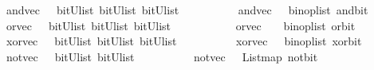 \begin{isabellebody}
{}\isanewline
{}\isamarkupfalse%
\ and{\isacharunderscore}vec\ \ {\isacharcolon}{\isacharcolon}\ {\isachardoublequoteopen}{\isacharparenleft}bitU{\isacharparenright}list\ {\isasymRightarrow}{\isacharparenleft}bitU{\isacharparenright}list\ {\isasymRightarrow}{\isacharparenleft}bitU{\isacharparenright}list\ {\isachardoublequoteclose}\ \ \ \isanewline
\ \ \ \ \ {\isachardoublequoteopen}\ and{\isacharunderscore}vec\ {\isacharequal}\ {\isacharparenleft}\ binop{\isacharunderscore}list\ and{\isacharunderscore}bit\ {\isacharparenright}{\isachardoublequoteclose}\isanewline
\isanewline
{}\isamarkupfalse%
\ or{\isacharunderscore}vec\ \ {\isacharcolon}{\isacharcolon}\ {\isachardoublequoteopen}{\isacharparenleft}bitU{\isacharparenright}list\ {\isasymRightarrow}{\isacharparenleft}bitU{\isacharparenright}list\ {\isasymRightarrow}{\isacharparenleft}bitU{\isacharparenright}list\ {\isachardoublequoteclose}\ \ \ \ \isanewline
\ \ \ \ \ {\isachardoublequoteopen}\ or{\isacharunderscore}vec\ \ {\isacharequal}\ {\isacharparenleft}\ binop{\isacharunderscore}list\ or{\isacharunderscore}bit\ {\isacharparenright}{\isachardoublequoteclose}\isanewline
\isanewline
{}\isamarkupfalse%
\ xor{\isacharunderscore}vec\ \ {\isacharcolon}{\isacharcolon}\ {\isachardoublequoteopen}{\isacharparenleft}bitU{\isacharparenright}list\ {\isasymRightarrow}{\isacharparenleft}bitU{\isacharparenright}list\ {\isasymRightarrow}{\isacharparenleft}bitU{\isacharparenright}list\ {\isachardoublequoteclose}\ \ \ \isanewline
\ \ \ \ \ {\isachardoublequoteopen}\ xor{\isacharunderscore}vec\ {\isacharequal}\ {\isacharparenleft}\ binop{\isacharunderscore}list\ xor{\isacharunderscore}bit\ {\isacharparenright}{\isachardoublequoteclose}\isanewline
\isanewline
{}\isamarkupfalse%
\ not{\isacharunderscore}vec\ \ {\isacharcolon}{\isacharcolon}\ {\isachardoublequoteopen}{\isacharparenleft}bitU{\isacharparenright}list\ {\isasymRightarrow}{\isacharparenleft}bitU{\isacharparenright}list\ {\isachardoublequoteclose}\ \ \ \isanewline
\ \ \ \ \ {\isachardoublequoteopen}\ not{\isacharunderscore}vec\ {\isacharequal}\ {\isacharparenleft}\ List{\isachardot}map\ not{\isacharunderscore}bit\ {\isacharparenright}{\isachardoublequoteclose}\isanewline
\isanewline
\isanewline
%
\end{isabellebody}
